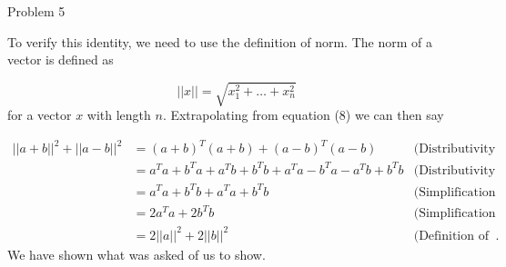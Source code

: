 \begin{problem}{Problem 5}
\begin{Highlight}
        To verify this identity, we need to use the definition of norm. The norm of a vector is defined as

        \begin{equation}
            ||x|| = \sqrt{x^{2}_{1} + \dots + x^{2}_{n}}
        \end{equation}
        for a vector $x$ with length $n$. Extrapolating from equation (8) we can then say

        \begin{align}
            ||a + b||^{2} + ||a - b||^{2} & = (a + b)^{T}(a + b) + (a - b)^{T}(a - b) & \text{(Distributivity of norms)} \\
            & = a^{T}a + b^{T}a + a^{T}b + b^{T}b + a^{T}a - b^{T}a - a^{T}b + b^{T}b & \text{(Distributivity of norms)} \\
            & = a^{T}a + b^{T}b + a^{T}a + b^{T}b & \text{(Simplification by subtraction)} \\
            & = 2a^{T}a + 2b^{T}b & \text{(Simplification by addition)} \\
            & = 2||a||^{2} + 2||b||^{2} & \text{(Definition of inner products)}.
        \end{align}
        We have shown what was asked of us to show.
    \end{Highlight}
\end{problem}

